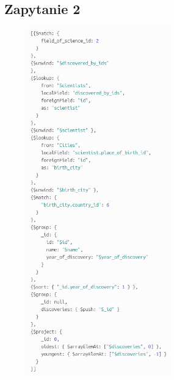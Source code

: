 \documentclass[11pt]{article}
\begin{document}
	\subsection{Zapytanie 2}
		\begin{figure}[!ht]
			\begin{center}
				\includegraphics[width=230px]{m2.png}
			\end{center}
		\end{figure}

\newpage
\end{document}

